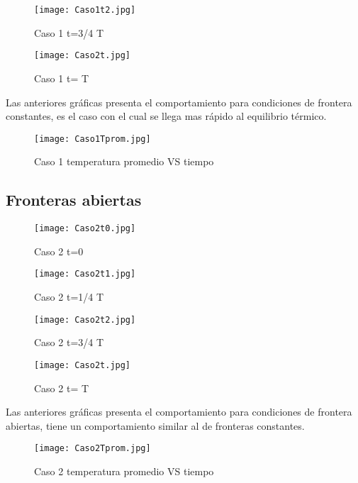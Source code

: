 \documentclass{article}
\begin{document}
\begin{figure}[h!]
\centering
\texttt{[image: Caso1t2.jpg]}
\caption{Caso 1 t=3/4 T}
\label{fig:3}
\end{figure}

\begin{figure}[h!]
\centering
\texttt{[image: Caso2t.jpg]}
\caption{Caso 1 t= T}
\label{fig:4}
\end{figure}

Las anteriores gráficas presenta el comportamiento para condiciones de frontera constantes, es el caso con el cual se llega mas rápido al equilibrio térmico.\\

\begin{figure}[h!]
\centering
\texttt{[image: Caso1Tprom.jpg]}
\caption{Caso 1 temperatura promedio VS tiempo}
\label{fig:13}
\end{figure}

\subsection{Fronteras abiertas}

\begin{figure}[h!]
\centering
\texttt{[image: Caso2t0.jpg]}
\caption{Caso 2 t=0}
\label{fig:5}
\end{figure}

\begin{figure}[h!]
\centering
\texttt{[image: Caso2t1.jpg]}
\caption{Caso 2 t=1/4 T}
\label{fig:6}
\end{figure}

\begin{figure}[h!]
\centering
\texttt{[image: Caso2t2.jpg]}
\caption{Caso 2 t=3/4 T}
\label{fig:7}
\end{figure}

\begin{figure}[h!]
\centering
\texttt{[image: Caso2t.jpg]}
\caption{Caso 2 t= T}
\label{fig:8}
\end{figure}

Las anteriores gráficas presenta el comportamiento para condiciones de frontera abiertas, tiene un comportamiento similar al de fronteras constantes.\\

\begin{figure}[h!]
\centering
\texttt{[image: Caso2Tprom.jpg]}
\caption{Caso 2 temperatura promedio VS tiempo}
\label{fig:14}
\end{figure}
\end{document}
